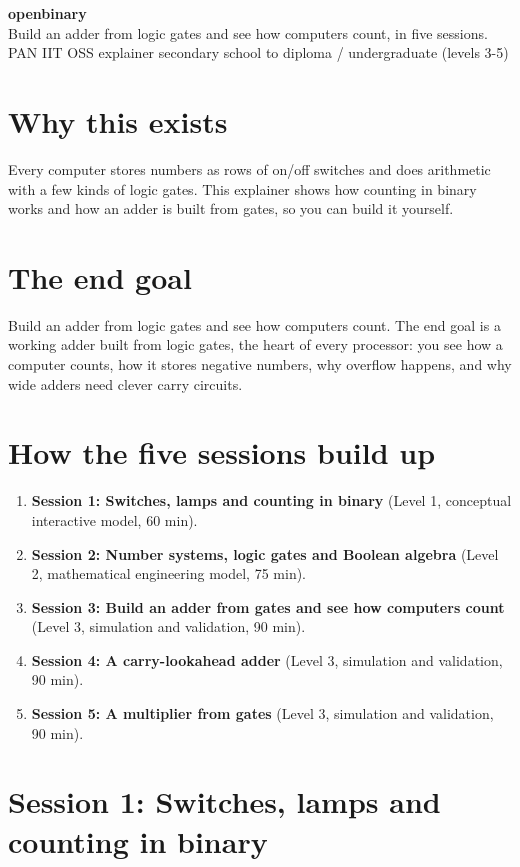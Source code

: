 \documentclass[11pt,a4paper]{article}
\begin{document}
\begin{center}{\LARGE\bfseries openbinary}\\[0.4em]{\large Build an adder from logic gates and see how computers count, in five sessions.}\\[0.2em]\small PAN IIT OSS explainer \textbullet{} secondary school to diploma / undergraduate (levels 3-5)\end{center}

\section*{Why this exists}
Every computer stores numbers as rows of on/off switches and does arithmetic with a few kinds of logic gates. This explainer shows how counting in binary works and how an adder is built from gates, so you can build it yourself.

\section*{The end goal}
Build an adder from logic gates and see how computers count. The end goal is a working adder built from logic gates, the heart of every processor: you see how a computer counts, how it stores negative numbers, why overflow happens, and why wide adders need clever carry circuits.

\section*{How the five sessions build up}
\begin{enumerate}[nosep]
\item \textbf{Session 1: Switches, lamps and counting in binary} (Level 1, conceptual interactive model, 60 min).
\item \textbf{Session 2: Number systems, logic gates and Boolean algebra} (Level 2, mathematical engineering model, 75 min).
\item \textbf{Session 3: Build an adder from gates and see how computers count} (Level 3, simulation and validation, 90 min).
\item \textbf{Session 4: A carry-lookahead adder} (Level 3, simulation and validation, 90 min).
\item \textbf{Session 5: A multiplier from gates} (Level 3, simulation and validation, 90 min).
\end{enumerate}

\section{Session 1: Switches, lamps and counting in binary}
\end{document}
